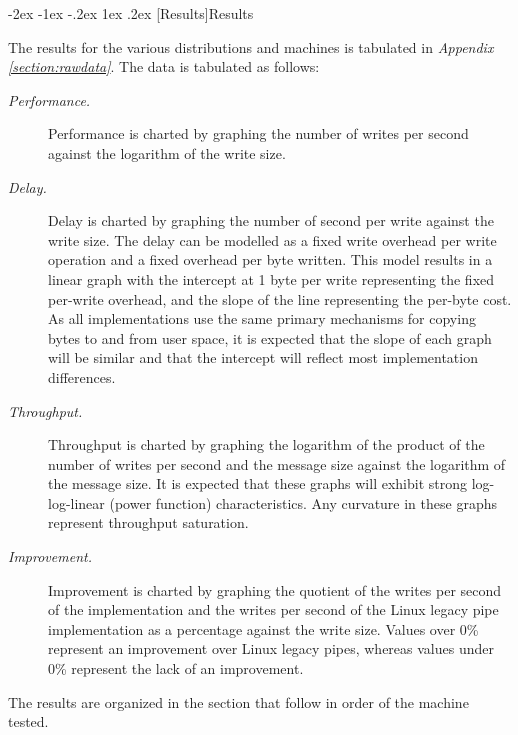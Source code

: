 \documentclass[letterpaper,final,notitlepage,twocolumn,10pt,twoside]{article}
\makeatletter
\let\large = \normalsize
\let\normalsize = \small
\let\small = \footnotesize
\let\footnotesize = \scriptsize
\let\scriptsize = \tiny
\renewcommand\section{\@startsection {section}{1}{\z@}%
                                   {-2ex \@plus -1ex \@minus -.2ex}%
                                   {1ex \@plus .2ex}%
                                   {\normalfont\large\bfseries}}
\makeatother
\begin{document}
\section[Results]{Results}

The results for the various distributions and machines is tabulated in \textit{Appendix
\ref{section:rawdata}}.  The data is tabulated as follows:

\begin{description}

\item[{\it Performance.}]

Performance is charted by graphing the number of writes per second against the logarithm of the
write size.

\item[{\it Delay.}]

Delay is charted by graphing the number of second per write against the write size.  The delay can
be modelled as a fixed write overhead per write operation and a fixed overhead per byte written.
This model results in a linear graph with the intercept at 1 byte per write representing the fixed
per-write overhead, and the slope of the line representing the per-byte cost.  As all
implementations use the same primary mechanisms for copying bytes to and from user space, it is
expected that the slope of each graph will be similar and that the intercept will reflect most
implementation differences.

\item[{\it Throughput.}]

Throughput is charted by graphing the logarithm of the product of the number of writes per second
and the message size against the logarithm of the message size.  It is expected that these graphs
will exhibit strong log-log-linear (power function) characteristics.  Any curvature in these graphs
represent throughput saturation.

\item[{\it Improvement.}]

Improvement is charted by graphing the quotient of the writes per second of the implementation and
the writes per second of the Linux legacy pipe implementation as a percentage against the write
size.  Values over 0\% represent an improvement over Linux legacy pipes, whereas values under 0\%
represent the lack of an improvement.

\end{description}

The results are organized in the section that follow in order of the machine tested.
\end{document}
